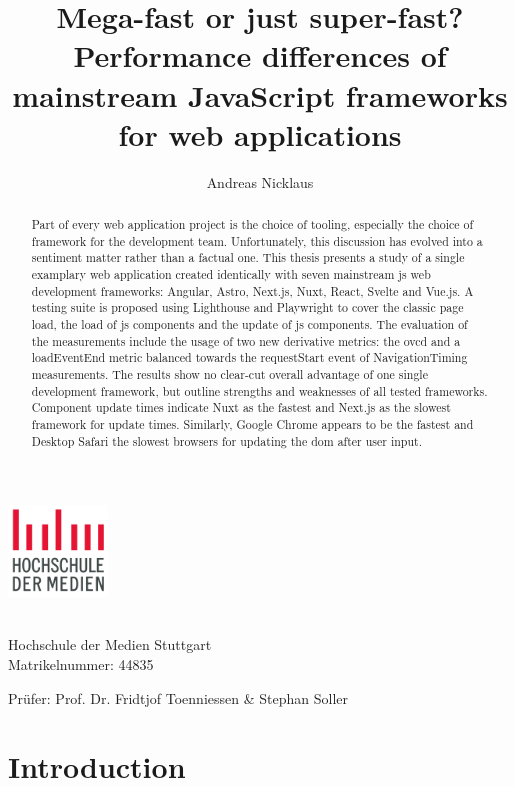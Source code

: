 \documentclass[a4paper, 12pt]{article}
\title{Mega-fast or just super-fast? Performance differences of mainstream JavaScript frameworks for web applications}
\author{Andreas Nicklaus}
\makeatletter
\let\Title\@title
\let\Author\@author
\makeatother
\begin{document}
\begin{center}
  \includegraphics[width=100px, keepaspectratio]{img/hdm-logo.png}
\end{center}	
  
\vspace{20px}
\noindent{\Large\bfseries \Title}
\vspace{10px}

\noindent\textbf{\Author}\\
Hochschule der Medien Stuttgart\\
Matrikelnummer: 44835 

\vspace{10px}
\noindent Prüfer: Prof. Dr. Fridtjof Toenniessen \& Stephan Soller

\begin{abstract}
  Part of every web application project is the choice of tooling, especially the choice of framework for the development team.
  Unfortunately, this discussion has evolved into a sentiment matter rather than a factual one.
  This thesis presents a study of a single examplary web application created identically with seven mainstream \acrlong{js} web development frameworks: Angular, Astro, Next.js, Nuxt, React, Svelte and Vue.js.
  A testing suite is proposed using Lighthouse and Playwright to cover the classic page load, the load of \acrlong{js} components and the update of \acrlong{js} components.
  The evaluation of the measurements include the usage of two new derivative metrics: the \acrfull{ovcd} and a loadEventEnd metric balanced towards the requestStart event of NavigationTiming measurements.
  The results show no clear-cut overall advantage of one single development framework, but outline strengths and weaknesses of all tested frameworks.
  Component update times indicate Nuxt as the fastest and Next.js as the slowest framework for update times.
  Similarly, Google Chrome appears to be the fastest and Desktop Safari the slowest browsers for updating the \acrshort{dom} after user input. 
\end{abstract}


\section{Introduction}
\end{document}
